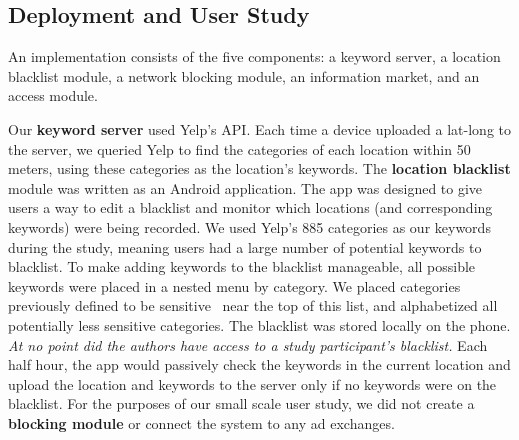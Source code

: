 \subsection{Deployment and User Study}
An implementation consists of the five components:
a keyword server, a location blacklist module, a network blocking module, an information market, and an access module.

Our \textbf{keyword server} used Yelp's API.  %
Each time a device uploaded a lat-long to the server, we queried Yelp to find the categories of each location within 50 meters, using these categories as the location's keywords.
The \textbf{location blacklist} module was written as an Android application. 
The app was designed to give users a way to edit a blacklist and monitor which locations (and corresponding keywords) were being recorded. 
We used Yelp's 885 categories as our keywords during the study, meaning users had a large number of potential keywords to blacklist.
To make adding keywords to the blacklist manageable, all possible keywords were placed in a nested menu by category. 
We placed categories previously defined to be sensitive~\cite{bing} near the top of this list, and alphabetized all potentially less sensitive categories.
The blacklist was stored locally on the phone. 
\emph{At no point did the authors have access to a study participant's blacklist.}
Each half hour, the app would passively check the keywords in the current location and upload the location and keywords to the server only if no keywords were on the blacklist.
For the purposes of our small scale user study, we did not create a \textbf{blocking module} or connect the system to any ad exchanges.

